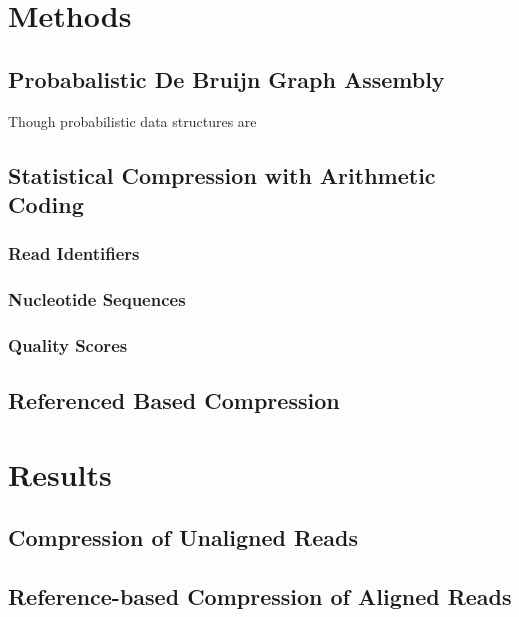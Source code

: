 \documentclass[twocolumn]{article}
\begin{document}

\section{Methods}

\subsection{Probabalistic De Bruijn Graph Assembly}


Though probabilistic data structures are 


\subsection{Statistical Compression with Arithmetic Coding}

\subsubsection{Read Identifiers}

\subsubsection{Nucleotide Sequences}

\subsubsection{Quality Scores}

\subsection{Referenced Based Compression}





\section{Results}


\subsection{Compression of Unaligned Reads}

\subsection{Reference-based Compression of Aligned Reads}
\end{document}
